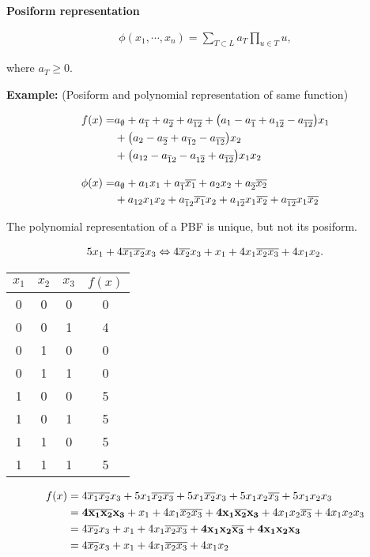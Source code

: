 \textbf{Posiform representation}

\begin{align*}
	\phi(x_1,\cdots,x_n) = \sum_{T \subset L}{a_T}\prod_{u \in T}{u},
\end{align*}

where $a_T \geq 0$.

\textbf{Example:} (Posiform and polynomial representation of same function)

\begin{align*}
	f(x) =& a_{\emptyset} + a_{\overline{1}} + a_{\overline{2}} + a_{\overline{12}} + \big(a_1 - a_{\overline{1}} + a_{1{\overline{2}}} - a_{\overline{12}}\big)x_1 \\
	&+ \big(a_{2} - a_{\overline{2}} + a_{{\overline{1}}2} - a_{{\overline{12}}}\big)x_2\\ 
	&+ \big(a_{12} - a_{{\overline{1}}2} - a_{1{\overline{2}}} + a_{{\overline{12}}}\big)x_1x_2 \\[1em]
	\phi(x) =& a_{\emptyset} + a_1x_1 + a_{\overline{1}}{\overline{x_1}} + a_2x_2 + a_{\overline{2}}{\overline{x_2}} \\ 
			&+ a_{12}x_1x_2 + a_{{\overline{1}}2}{\overline{x_1}}x_2 + a_{1{\overline{2}}}x_1{\overline{x_2}} + a_{{\overline{12}}}x_1{\overline{x_2}}
\end{align*}

The polynomial representation of a PBF is unique, but not its posiform.

\begin{align*}
	5x_1 + 4{\overline{x_1}}{\overline{x_2}}x_3 \Leftrightarrow 4{\overline{x_2}}x_3 + x_1 + 4x_1{\overline{x_2}}{\overline{x_3}} + 4x_1x_2.
\end{align*}

\begin{center}
\begin{tabular}{|c|c|c|c|}
\hline
$x_1$ & $x_2$ & $x_3$ & $f(x)$\\
\hline
0 & 0 & 0 & 0 \\
0 & 0 & 1 & 4 \\
0 & 1 & 0 & 0 \\
0 & 1 & 1 & 0 \\
1 & 0 & 0 & 5 \\
1 & 0 & 1 & 5 \\
1 & 1 & 0 & 5 \\
1 & 1 & 1 & 5 \\
\hline
\end{tabular}
\end{center}

\begin{align*}
	f(x) &= 4{\overline{x_1}}{\overline{x_2}}x_3 + 5x_1{\overline{x_2}}{\overline{x_3}} + 5x_1{\overline{x_2}}x_3 + 5x_1x_2{\overline{x_3}} + 5x_1x_2x_3 \\
		 &= \mathbf{ 4{\overline{x_1}}{\overline{x_2}}x_3 } + x_1 + 4x_1{\overline{x_2}}{\overline{x_3}} + \mathbf{4x_1{\overline{x_2}}x_3} + 4x_1x_2{\overline{x_3}} + 4x_1x_2x_3 \\	
		 &= 4{\overline{x_2}}x_3 + x_1 + 4x_1{\overline{x_2}}{\overline{x_3}} + \mathbf{4x_1x_2{\overline{x_3}}} + \mathbf{4x_1x_2x_3} \\
		 &= 4{\overline{x_2}}x_3 + x_1 + 4x_1{\overline{x_2}}{\overline{x_3}} + 4x_1x_2 		 			 	
\end{align*}

